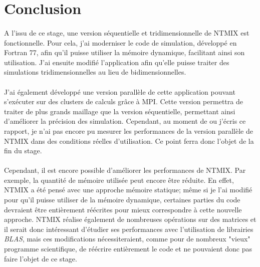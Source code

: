\section*{Conclusion}

\paragraph{}A l'issu de ce stage, une version séquentielle et tridimensionnelle de NTMIX est fonctionnelle. Pour cela, j'ai moderniser le code de simulation, développé en Fortran 77, afin qu'il puisse utiliser la mémoire dynamique, facilitant ainsi son utilisation. J'ai ensuite modifié l'application afin qu'elle puisse traiter des simulations tridimensionnelles au lieu de bidimensionnelles.


\paragraph{}J'ai également développé une version parallèle de cette application pouvant s'exécuter sur des clusters de calculs grâce à MPI. Cette version permettra de traiter de plus grands maillage que la version séquentielle, permettant ainsi d'améliorer la précision des simulation. Cependant, au moment de ou j'écris ce rapport, je n'ai pas encore pu mesurer les performances de la version parallèle de NTMIX dans des conditions réelles d'utilisation. Ce point ferra donc l'objet de la fin du stage.




\paragraph{}Cependant, il est encore possible d'améliorer les performances de NTMIX. Par exemple, la quantité de mémoire utilisée peut encore être réduite. En effet, NTMIX a été pensé avec une approche mémoire statique; même si je l'ai modifié pour qu'il puisse utiliser de la mémoire dynamique, certaines parties du code devraient être entièrement réécrites pour mieux correspondre à cette nouvelle approche. 
NTMIX réalise également de nombreuses opérations sur des matrices et il serait donc intéressant d'étudier ses performances avec l'utilisation de librairies \textit{BLAS}, mais ces modifications nécessiteraient, comme pour de nombreux "vieux" programme scientifique, de réécrire entièrement le code et ne pouvaient donc pas faire l'objet de ce stage.

